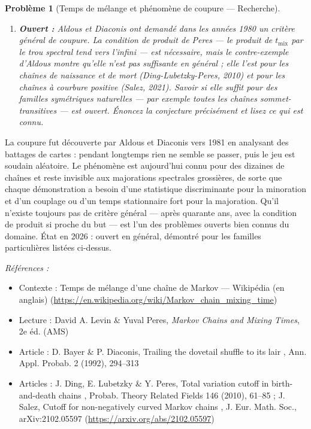 \documentclass[11pt]{article}
\newtheorem{problem}{Problème}
\newenvironment{refs}{\par\small\noindent\emph{Références :}\begin{itemize}\setlength\itemsep{0pt}}{\end{itemize}\normalsize}
\begin{document}
\begin{problem}[{Temps de mélange et phénomène de coupure --- Recherche}]
\begin{enumerate}
(riffle shuffle) d'un jeu de $ n $ cartes présente une coupure à $ \tfrac32 \log_2 n $
battages, source des fameux \og{} sept battages \fg{} pour $ n = 52 $. Énoncez précisément ce que ce
théorème affirme et ce qu'il n'affirme pas.
\item[(iv)] \textbf{Ouvert :} Aldous et Diaconis ont demandé dans les années 1980 un critère général de
coupure. La \textit{condition de produit} de Peres --- le produit de $ t_{\mathrm{mix}} $ par le trou
spectral tend vers l'infini --- est nécessaire, mais le contre-exemple d'Aldous montre qu'elle n'est
pas suffisante en général ; elle l'\textit{est} pour les chaînes de naissance et de mort
(Ding-Lubetzky-Peres, 2010) et pour les chaînes à courbure positive (Salez, 2021). Savoir si elle
suffit pour des familles symétriques naturelles --- par exemple toutes les chaînes sommet-transitives
--- est ouvert. Énoncez la conjecture précisément et lisez ce qui est connu.
\end{enumerate}

\end{problem}

\noindent La coupure fut découverte par Aldous et Diaconis vers 1981 en analysant des
battages de cartes : pendant longtemps rien ne semble se passer, puis le jeu est soudain aléatoire.
Le phénomène est aujourd'hui connu pour des dizaines de chaînes et reste invisible aux majorations
spectrales grossières, de sorte que chaque démonstration a besoin d'une statistique discriminante
pour la minoration et d'un couplage ou d'un temps stationnaire fort pour la majoration. Qu'il
n'existe toujours pas de critère général --- après quarante ans, avec la condition de produit si
proche du but --- est l'un des problèmes ouverts bien connus du domaine. État en 2026 : ouvert en
général, démontré pour les familles particulières listées ci-dessus.

\begin{refs}
\item Contexte : Temps de mélange d'une chaîne de Markov --- Wikipédia (en anglais) (\url{https://en.wikipedia.org/wiki/Markov_chain_mixing_time})
\item Lecture : David A. Levin \& Yuval Peres, \textit{Markov Chains and Mixing Times}, 2e éd. (AMS)
\item Article : D. Bayer \& P. Diaconis, \og{} Trailing the dovetail shuffle to its lair \fg{}, Ann. Appl. Probab. 2 (1992), 294--313
\item Articles : J. Ding, E. Lubetzky \& Y. Peres, \og{} Total variation cutoff in birth-and-death chains \fg{}, Probab. Theory Related Fields 146 (2010), 61--85 ; J. Salez, \og{} Cutoff for non-negatively curved Markov chains \fg{}, J. Eur. Math. Soc., arXiv:2102.05597 (\url{https://arxiv.org/abs/2102.05597})
\end{refs}
\end{document}
